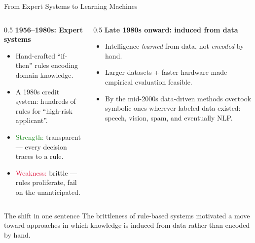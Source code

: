 \documentclass[9pt,t]{beamer}
\begin{document}
\begin{frame}{From Expert Systems to Learning Machines}

\begin{columns}[T]
\begin{column}{0.5\textwidth}
\textbf{1956--1980s: Expert systems}
\begin{itemize}
  \item Hand-crafted ``if-then'' rules encoding domain knowledge.
  \item A 1980s credit system: hundreds of rules for ``high-risk applicant''.
  \item \textcolor{forestgreen}{Strength:} transparent --- every decision traces to a rule.
  \item \textcolor{crimson}{Weakness:} brittle --- rules proliferate, fail on the unanticipated.
\end{itemize}
\end{column}
\begin{column}{0.5\textwidth}
\textbf{Late 1980s onward: induced from data}
\begin{itemize}
  \item Intelligence \emph{learned} from data, not \emph{encoded} by hand.
  \item Larger datasets + faster hardware made empirical evaluation feasible.
  \item By the mid-2000s data-driven methods overtook symbolic ones wherever labeled data existed:
        speech, vision, spam, and eventually NLP.
\end{itemize}
\end{column}
\end{columns}

\medskip
\begin{block}{The shift in one sentence}
The brittleness of rule-based systems motivated a move toward approaches in
which knowledge is \alert{induced from data rather than encoded by hand}.
\end{block}
\end{frame}
\end{document}
